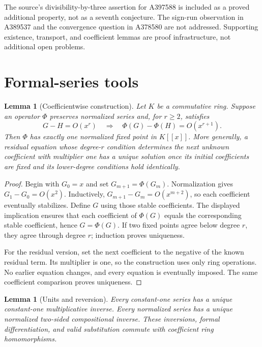 \documentclass[11pt,a4paper]{article}
\newtheorem{lemma}[theorem]{Lemma}
\theoremstyle{remark}
\newcommand{\ps}[1]{#1[[x]]}
\begin{document}
The source's divisibility-by-three assertion for A397588 is included as a
proved additional property, not as a seventh conjecture. The sign-run
observation in A389537 and the convergence question in A378580 are not
addressed. Supporting existence, transport, and coefficient lemmas are
proof infrastructure, not additional open problems.

\section{Formal-series tools}

\begin{lemma}[Coefficientwise construction]\label{lem:contraction}
Let $K$ be a commutative ring. Suppose an operator $\Phi$ preserves
normalized series and, for $r\ge2$, satisfies
\[
 G-H=O(x^r)\quad\Longrightarrow\quad
 \Phi(G)-\Phi(H)=O(x^{r+1}).
\]
Then $\Phi$ has exactly one normalized fixed point in $\ps K$.
More generally, a residual equation whose degree-$r$ condition determines
the next unknown coefficient with multiplier one has a unique solution
once its initial coefficients are fixed and its lower-degree conditions
hold identically.
\end{lemma}

\begin{proof}
Begin with $G_0=x$ and set $G_{m+1}=\Phi(G_m)$. Normalization gives
$G_1-G_0=O(x^2)$. Inductively,
$G_{m+1}-G_m=O(x^{m+2})$, so each coefficient eventually stabilizes.
Define $G$ using those stable coefficients. The displayed implication
ensures that each coefficient of $\Phi(G)$ equals the corresponding stable
coefficient, hence $G=\Phi(G)$. If two fixed points agree below degree
$r$, they agree through degree $r$; induction proves uniqueness.

For the residual version, set the next coefficient to the negative of the
known residual term. Its multiplier is one, so the construction uses only
ring operations. No earlier equation changes, and every equation is
eventually imposed. The same coefficient comparison proves uniqueness.
\end{proof}

\begin{lemma}[Units and reversion]\label{lem:inverse}
Every constant-one series has a unique constant-one multiplicative
inverse. Every normalized series has a unique normalized two-sided
compositional inverse. These inversions, formal differentiation, and
valid substitution commute with coefficient ring homomorphisms.
\end{lemma}
\end{document}
